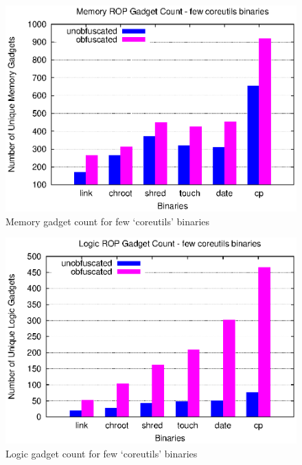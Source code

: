 \begin{figure}[h]
    \includegraphics[width=\linewidth]{figures/memory.eps}
    \captionsetup{font=footnotesize, labelfont=bf, justification=centering}
    \caption{Memory gadget count for few `coreutils' binaries}
    \label{fig:memory}
\end{figure}

\begin{figure}[h]
    \includegraphics[width=\linewidth]{figures/logic.eps}
    \captionsetup{font=footnotesize, labelfont=bf, justification=centering}
    \caption{Logic gadget count for few `coreutils' binaries}
    \label{fig:logic}
\end{figure}



